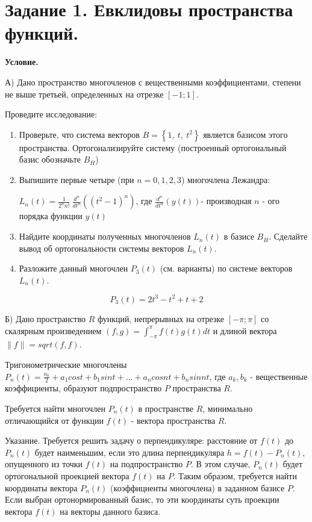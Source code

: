 \section{Задание 1. Евклидовы пространства функций.}

\textbf{Условие.}


А) Дано пространство многочленов с вещественными коэффициентами, степени не выше третьей, определенных на отрезке $[-1; 1]$.

Проведите исследование:
\begin{enumerate}
	\item Проверьте, что система векторов $B=\left\{1,\ t,\ t^2\right\}$ является базисом этого пространства. Ортогонализируйте систему (построенный ортогональный базис обозначьте $B_H$)
	\item Выпишите первые четыре (при $n=0,1,2,3$) многочлена Лежандра:

$L_n\left(t\right)=\frac{1}{2^nn!}\ \frac{d^n}{dt^n}\left(\left(t^2-1\right)^n\right)\text{, где }\frac{d^n}{dt^n}\left(y\left(t\right)\right)$- производная $n$ - ого порядка функции $y\left(t\right)$
	\item Найдите координаты полученных многочленов $L_n\left(t\right)$ в базисе $B_H$. Сделайте вывод об ортогональности системы векторов $L_n\left(t\right)$.
	\item Разложите данный многочлен $P_3\left(t\right)$ (см. варианты) по системе векторов $L_n\left(t\right)$.
\end{enumerate}

\[P_3\left(t\right)=2t^3-t^2+t+2\]

\vspace{10mm}

Б) Дано пространство $R$ функций, непрерывных на отрезке $[-\pi; \pi]$ со скалярным произведением $(f, g) = \int^\pi_{-\pi} f(t)g(t)dt$ и длиной вектора $\|f\| = sqrt{(f, f)}$.

Тригонометрические многочлены $P_n(t) = \frac{a_0}{2} + a_1 cost + b_1 sin t + \dots + a_n cos nt + b_n sin nt$, где $a_k, b_k$ - вещественные коэффициенты,
образуют подпространство $P$ пространства $R$.

Требуется найти многочлен $P_n(t)$ в пространстве $R$, минимально отличающийся от функции $f(t)$ - вектора пространства $R$.

Указание.
Требуется решить задачу о перпендикуляре: расстояние от $f\left(t\right)$ до $P_n\left(t\right)$ будет наименьшим,
если это длина перпендикуляра $h=f\left(t\right)-P_n\left(t\right)$, опущенного из точки $f\left(t\right)$ на подпространство $P$.
В этом случае, $P_n\left(t\right)$ будет ортогональной проекцией вектора $f\left(t\right)$ на $P$.
Таким образом, требуется найти координаты вектора $P_n\left(t\right)$ (коэффициенты многочлена) в заданном базисе $P$.
Если выбран ортонормированный базис, то эти координаты суть проекции вектора $f\left(t\right)$ на векторы данного базиса.

